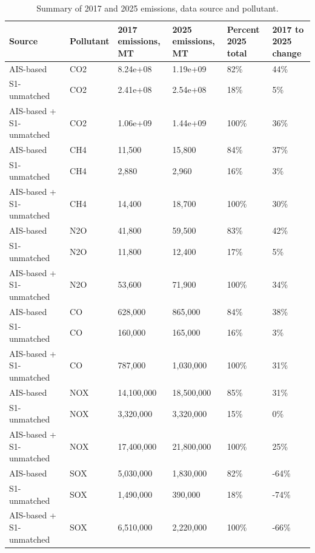 \begin{table}[!h]
\centering
\caption{\label{tab:total_percent_change_by_fleet}Summary of 2017 and 2025 emissions, data source and pollutant.}
\centering
\fontsize{6}{8}\selectfont
\setlength{\tabcolsep}{3pt}
\begin{tabular}[t]{l|l|l|l|l|l}
\hline
Source & Pollutant & \shortstack{2017\\emissions, MT} & \shortstack{2025\\emissions, MT} & \shortstack{Percent 2025\\total} & \shortstack{2017 to 2025\\change}\\
\hline
AIS-based & CO2 & 8.24e+08 & 1.19e+09 & 82\% & 44\%\\
\hline
S1-unmatched & CO2 & 2.41e+08 & 2.54e+08 & 18\% & 5\%\\
\hline
AIS-based + S1-unmatched & CO2 & 1.06e+09 & 1.44e+09 & 100\% & 36\%\\
\hline
AIS-based & CH4 & 11,500 & 15,800 & 84\% & 37\%\\
\hline
S1-unmatched & CH4 & 2,880 & 2,960 & 16\% & 3\%\\
\hline
AIS-based + S1-unmatched & CH4 & 14,400 & 18,700 & 100\% & 30\%\\
\hline
AIS-based & N2O & 41,800 & 59,500 & 83\% & 42\%\\
\hline
S1-unmatched & N2O & 11,800 & 12,400 & 17\% & 5\%\\
\hline
AIS-based + S1-unmatched & N2O & 53,600 & 71,900 & 100\% & 34\%\\
\hline
AIS-based & CO & 628,000 & 865,000 & 84\% & 38\%\\
\hline
S1-unmatched & CO & 160,000 & 165,000 & 16\% & 3\%\\
\hline
AIS-based + S1-unmatched & CO & 787,000 & 1,030,000 & 100\% & 31\%\\
\hline
AIS-based & NOX & 14,100,000 & 18,500,000 & 85\% & 31\%\\
\hline
S1-unmatched & NOX & 3,320,000 & 3,320,000 & 15\% & 0\%\\
\hline
AIS-based + S1-unmatched & NOX & 17,400,000 & 21,800,000 & 100\% & 25\%\\
\hline
AIS-based & SOX & 5,030,000 & 1,830,000 & 82\% & -64\%\\
\hline
S1-unmatched & SOX & 1,490,000 & 390,000 & 18\% & -74\%\\
\hline
AIS-based + S1-unmatched & SOX & 6,510,000 & 2,220,000 & 100\% & -66\%\\

\end{tabular}
\end{table}
